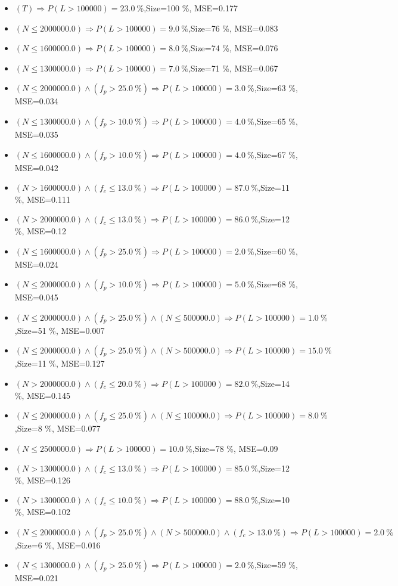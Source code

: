 \documentclass[numbered]{CSL}
\begin{document}
\begin{itemize}
\item $(T) \Rightarrow P(L > 100 000) = 23.0~\%$,\hfill Size=100 \%, MSE=0.177
\item $(N \leq 2000000.0) \Rightarrow P(L > 100 000) = 9.0~\%$,\hfill Size=76 \%, MSE=0.083
\item $(N \leq 1600000.0) \Rightarrow P(L > 100 000) = 8.0~\%$,\hfill Size=74 \%, MSE=0.076
\item $(N \leq 1300000.0) \Rightarrow P(L > 100 000) = 7.0~\%$,\hfill Size=71 \%, MSE=0.067
\item $(N \leq 2000000.0) \land (f_p > 25.0~\%) \Rightarrow P(L > 100 000) = 3.0~\%$,\hfill Size=63 \%, MSE=0.034
\item $(N \leq 1300000.0) \land (f_p > 10.0~\%) \Rightarrow P(L > 100 000) = 4.0~\%$,\hfill Size=65 \%, MSE=0.035
\item $(N \leq 1600000.0) \land (f_p > 10.0~\%) \Rightarrow P(L > 100 000) = 4.0~\%$,\hfill Size=67 \%, MSE=0.042
\item $(N > 1600000.0) \land (f_c \leq 13.0~\%) \Rightarrow P(L > 100 000) = 87.0~\%$,\hfill Size=11 \%, MSE=0.111
\item $(N > 2000000.0) \land (f_c \leq 13.0~\%) \Rightarrow P(L > 100 000) = 86.0~\%$,\hfill Size=12 \%, MSE=0.12
\item $(N \leq 1600000.0) \land (f_p > 25.0~\%) \Rightarrow P(L > 100 000) = 2.0~\%$,\hfill Size=60 \%, MSE=0.024
\item $(N \leq 2000000.0) \land (f_p > 10.0~\%) \Rightarrow P(L > 100 000) = 5.0~\%$,\hfill Size=68 \%, MSE=0.045
\item $(N \leq 2000000.0) \land (f_p > 25.0~\%) \land (N \leq 500000.0) \Rightarrow P(L > 100 000) = 1.0~\%$,\hfill Size=51 \%, MSE=0.007
\item $(N \leq 2000000.0) \land (f_p > 25.0~\%) \land (N > 500000.0) \Rightarrow P(L > 100 000) = 15.0~\%$,\hfill Size=11 \%, MSE=0.127
\item $(N > 2000000.0) \land (f_c \leq 20.0~\%) \Rightarrow P(L > 100 000) = 82.0~\%$,\hfill Size=14 \%, MSE=0.145
\item $(N \leq 2000000.0) \land (f_p \leq 25.0~\%) \land (N \leq 100000.0) \Rightarrow P(L > 100 000) = 8.0~\%$,\hfill Size=8 \%, MSE=0.077
\item $(N \leq 2500000.0) \Rightarrow P(L > 100 000) = 10.0~\%$,\hfill Size=78 \%, MSE=0.09
\item $(N > 1300000.0) \land (f_c \leq 13.0~\%) \Rightarrow P(L > 100 000) = 85.0~\%$,\hfill Size=12 \%, MSE=0.126
\item $(N > 1300000.0) \land (f_c \leq 10.0~\%) \Rightarrow P(L > 100 000) = 88.0~\%$,\hfill Size=10 \%, MSE=0.102
\item $(N \leq 2000000.0) \land (f_p > 25.0~\%) \land (N > 500000.0) \land (f_c > 13.0~\%) \Rightarrow P(L > 100 000) = 2.0~\%$,\hfill Size=6 \%, MSE=0.016
\item $(N \leq 1300000.0) \land (f_p > 25.0~\%) \Rightarrow P(L > 100 000) = 2.0~\%$,\hfill Size=59 \%, MSE=0.021
\end{itemize}
\end{document}
